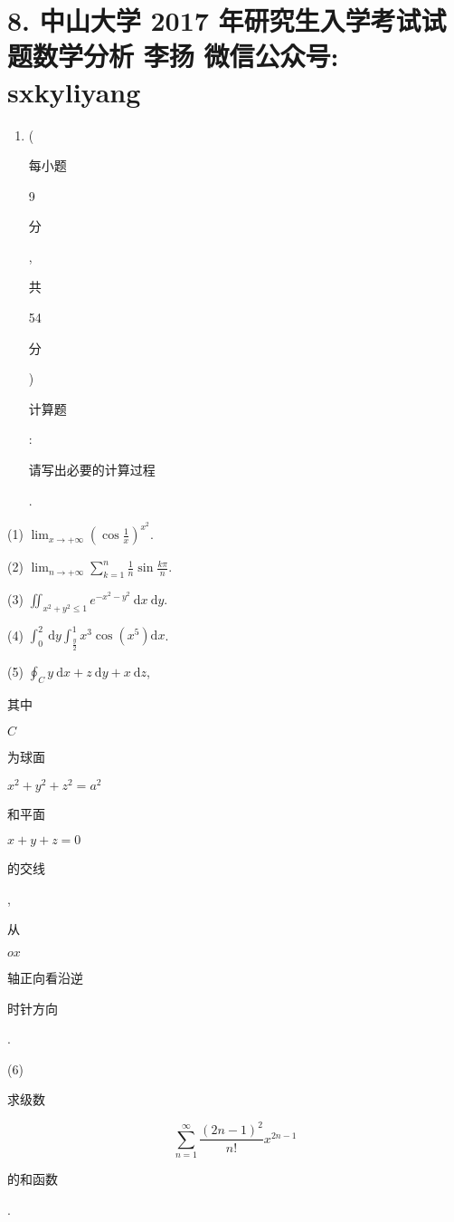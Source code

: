 \documentclass[10pt]{article}
\begin{document}
\section{8. 中山大学 2017 年研究生入学考试试题数学分析 
 李扬 
 微信公众号: sxkyliyang}
\begin{enumerate}
  \item (\begin{CJK}{UTF8}{mj}每小题\end{CJK} 9 \begin{CJK}{UTF8}{mj}分\end{CJK}, \begin{CJK}{UTF8}{mj}共\end{CJK} 54 \begin{CJK}{UTF8}{mj}分\end{CJK}) \begin{CJK}{UTF8}{mj}计算题\end{CJK}: \begin{CJK}{UTF8}{mj}请写出必要的计算过程\end{CJK}.
\end{enumerate}
(1) $\lim _{x \rightarrow+\infty}\left(\cos \frac{1}{x}\right)^{x^{2}}$.

(2) $\lim _{n \rightarrow+\infty} \sum_{k=1}^{n} \frac{1}{n} \sin \frac{k \pi}{n}$.

(3) $\iint_{x^{2}+y^{2} \leq 1} e^{-x^{2}-y^{2}} \mathrm{~d} x \mathrm{~d} y$.

(4) $\int_{0}^{2} \mathrm{~d} y \int_{\frac{y}{2}}^{1} x^{3} \cos \left(x^{5}\right) \mathrm{d} x$.

(5) $\oint_{C} y \mathrm{~d} x+z \mathrm{~d} y+x \mathrm{~d} z$, \begin{CJK}{UTF8}{mj}其中\end{CJK} $C$ \begin{CJK}{UTF8}{mj}为球面\end{CJK} $x^{2}+y^{2}+z^{2}=a^{2}$ \begin{CJK}{UTF8}{mj}和平面\end{CJK} $x+y+z=0$ \begin{CJK}{UTF8}{mj}的交线\end{CJK}, \begin{CJK}{UTF8}{mj}从\end{CJK} $o x$ \begin{CJK}{UTF8}{mj}轴正向看沿逆\end{CJK} \begin{CJK}{UTF8}{mj}时针方向\end{CJK}.

(6) \begin{CJK}{UTF8}{mj}求级数\end{CJK}
$$
\sum_{n=1}^{\infty} \frac{(2 n-1)^{2}}{n !} x^{2 n-1}
$$
\begin{CJK}{UTF8}{mj}的和函数\end{CJK}.
\end{document}
